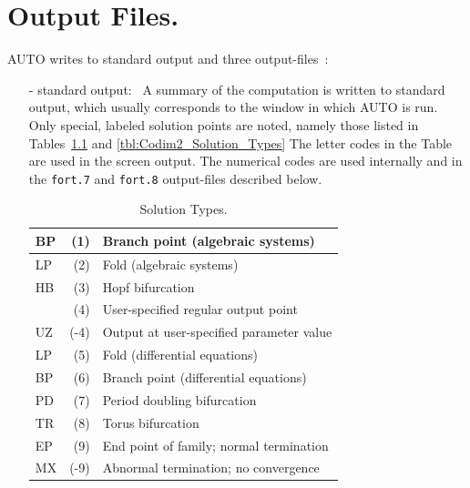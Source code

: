 \documentclass[12pt]{report}
\begin{document}
\chapter{ Output Files.} \label{ch:Output_files}
{\cal AUTO} writes to standard output and three output-files~:
\begin{itemize}
\item[-] standard output:~
  A summary of the computation is written to standard output, which usually
  corresponds to the window in which {\cal AUTO} is run. 
  Only special, labeled solution points are noted, namely those listed
  in Tables~\ref{tbl:Solution_Types} and \ref{tbl:Codim2_Solution_Types}
  The letter codes in the Table are used in the screen output.
  The numerical codes are used internally and in
  the {\tt fort.7} and {\tt fort.8} output-files described below.

\begin{table}[htbp]
\begin{center}
\begin{tabular}{| l | r | l |}
\hline
 BP & (1)  & Branch point (algebraic systems) \\
\hline
 LP & (2)  & Fold (algebraic systems) \\
\hline
 HB & (3)  & Hopf bifurcation \\
\hline
  & (4)  & User-specified regular output point \\
\hline
 UZ & (-4)  & Output at user-specified parameter value \\
\hline
 LP & (5)  & Fold (differential equations) \\
\hline
 BP & (6)  & Branch point (differential equations) \\
\hline
 PD & (7)  & Period doubling bifurcation \\
\hline
 TR & (8)  & Torus bifurcation \\
\hline
 EP & (9)  & End point of family; normal termination \\
\hline
 MX & (-9)  & Abnormal termination; no convergence \\
\hline
\end{tabular}
\caption{Solution Types.}
\label{tbl:Solution_Types}
\end{center}
\end{table}
 

\end{itemize}
\end{document}
